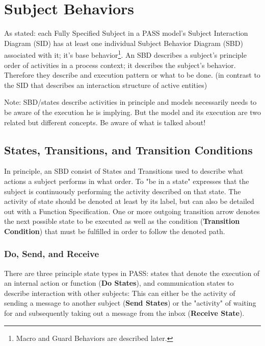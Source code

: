 \section{Subject Behaviors}

As stated: each Fully Specified Subject in a PASS model's Subject Interaction Diagram (SID) has at least one individual Subject Behavior Diagram (SBD) associated with it; it's base behavior\footnote{Macro and Guard Behaviors are described later.}. An SBD describes a subject's principle order of activities in a process context; it describes the subject's behavior. Therefore they describe and execution pattern or what to be done.  (in contrast to the SID that describes an interaction structure of active entities)

Note: SBD/states describe activities in principle and models necessarily needs to be aware of the execution he is implying. But the model and its execution are two related but different concepts. Be aware of what is talked about!


\subsection{States, Transitions, and Transition Conditions}
\label{sec:statesAndTransitions}

In principle, an SBD consist of States and Transitions used to describe what actions a subject performs in what order. To "be in a state" expresses that the subject is continuously performing the activity described on that state. The activity of state should be denoted at least by its label, but can also be detailed out with a Function Specification. One or more outgoing transition arrow denotes the next possible state to be executed as well as the condition (\textbf{Transition Condition}) that must be fulfilled in order to  follow the denoted path.  


\subsubsection{Do, Send, and Receive}

There are three principle state types in PASS: states that denote the execution of an internal action or function (\textbf{Do States}), and communication states to describe interaction with other subjects: This can either be the activity of sending a message to another subject (\textbf{Send States}) or the "activity" of waiting for and subsequently taking out a message from the inbox (\textbf{Receive State}).

